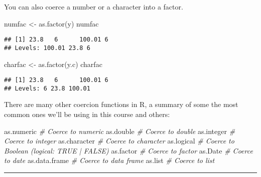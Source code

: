 \documentclass[
]{article}
\newenvironment{Shaded}{\begin{snugshade}}{\end{snugshade}}
\newcommand{\CommentTok}[1]{\textcolor[rgb]{0.56,0.35,0.01}{\textit{#1}}}
\newcommand{\FunctionTok}[1]{\textcolor[rgb]{0.00,0.00,0.00}{#1}}
\newcommand{\NormalTok}[1]{#1}
\newcommand{\OtherTok}[1]{\textcolor[rgb]{0.56,0.35,0.01}{#1}}
\begin{document}
You can also coerce a number or a character into a factor.

\begin{Shaded}
\begin{Highlighting}[]
\NormalTok{numfac }\OtherTok{\textless{}{-}} \FunctionTok{as.factor}\NormalTok{(y)}
\NormalTok{numfac}
\end{Highlighting}
\end{Shaded}

\begin{verbatim}
## [1] 23.8   6      100.01 6     
## Levels: 100.01 23.8 6
\end{verbatim}

\begin{Shaded}
\begin{Highlighting}[]
\NormalTok{charfac }\OtherTok{\textless{}{-}} \FunctionTok{as.factor}\NormalTok{(y.c)}
\NormalTok{charfac}
\end{Highlighting}
\end{Shaded}

\begin{verbatim}
## [1] 23.8   6      100.01 6     
## Levels: 6 23.8 100.01
\end{verbatim}

There are many other coercion functions in R, a summary of some the most
common ones we'll be using in this course and others:

\begin{Shaded}
\begin{Highlighting}[]
\NormalTok{as.numeric  }\CommentTok{\# Coerce to numeric}
\NormalTok{as.double   }\CommentTok{\# Coerce to double}
\NormalTok{as.integer  }\CommentTok{\# Coerce to integer}
\NormalTok{as.character }\CommentTok{\#  Coerce to character}
\NormalTok{as.logical  }\CommentTok{\# Coerce to Boolean (logical: TRUE | FALSE)}
\NormalTok{as.factor   }\CommentTok{\# Coerce to factor}
\NormalTok{as.Date  }\CommentTok{\# Coerce to date}
\NormalTok{as.data.frame  }\CommentTok{\# Coerce to data frame}
\NormalTok{as.list }\CommentTok{\# Coerce to list}
\end{Highlighting}
\end{Shaded}

\begin{center}\rule{0.5\linewidth}{0.5pt}\end{center}
\end{document}
